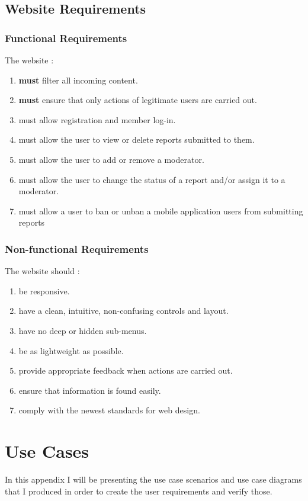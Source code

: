 \documentclass[12pt]{ecsproject}     %
\begin{document}
\section{Website Requirements}
\subsection{Functional Requirements}
The website :
\begin{enumerate}
\item \textbf{must} filter all incoming content.
\item \textbf{must} ensure that only actions of legitimate users are carried out.
\item must allow registration and member log-in.
\item must allow the user to view or delete reports submitted to them.
\item must allow the user to add or remove a moderator.
\item must allow the user to change the status of a report and/or assign it to a moderator.
\item must allow a user to ban or unban a mobile application users from submitting reports
\end{enumerate}

\subsection{Non-functional Requirements}
The website should :
\begin{enumerate}
\item be responsive.
\item have a clean, intuitive, non-confusing controls and layout.
\item have no deep or hidden sub-menus.
\item be as lightweight as possible.
\item provide appropriate feedback when actions are carried out.
\item ensure that information is found easily.
\item comply with the newest standards for web design.
\end{enumerate}


\chapter{Use Cases}
In this appendix I will be presenting the use case scenarios and use case diagrams that I produced in order to create the user requirements and verify those.
\end{document}
